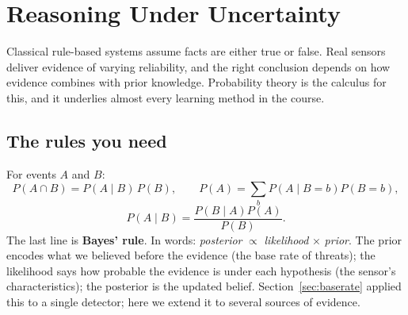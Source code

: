 \documentclass[11pt]{article}
\begin{document}
\section{Reasoning Under Uncertainty}
Classical rule-based systems assume facts are either true or false. Real sensors deliver evidence of varying reliability, and the right conclusion depends on how evidence combines with prior knowledge. Probability theory is the calculus for this, and it underlies almost every learning method in the course.

\subsection{The rules you need}
For events $A$ and $B$:
\[P(A\cap B)=P(A\mid B)\,P(B),\qquad P(A)=\sum_bP(A\mid B=b)P(B=b),\]\[P(A\mid B)=\frac{P(B\mid A)P(A)}{P(B)}.\]
The last line is \textbf{Bayes' rule}. In words: \emph{posterior} $\propto$ \emph{likelihood} $\times$ \emph{prior}. The prior encodes what we believed before the evidence (the base rate of threats); the likelihood says how probable the evidence is under each hypothesis (the sensor's characteristics); the posterior is the updated belief. Section~\ref{sec:baserate} applied this to a single detector; here we extend it to several sources of evidence.
\end{document}
